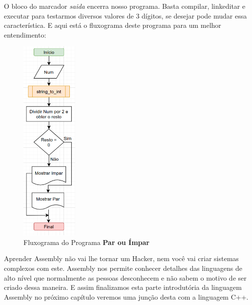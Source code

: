O bloco do marcador \textit{saida} encerra nosso programa. Basta compilar, linkeditar e executar para testarmos diversos valores de 3 dígitos, se desejar pode mudar essa característica. E aqui está o fluxograma deste programa para um melhor entendimento:
\begin{figure}[H]
	\centering
	\includegraphics[width=0.25\textwidth]{Pictures/cap01/programa17}
	\caption{Fluxograma do Programa \textbf{Par ou Ímpar}}
\end{figure}

Aprender Assembly não vai lhe tornar um Hacker, nem você vai criar sistemas complexos com este. Assembly nos permite conhecer detalhes das linguagens de alto nível que normalmente as pessoas desconhecem e não sabem o motivo de ser criado dessa maneira. E assim finalizamos esta parte introdutória da linguagem Assembly no próximo capítulo veremos uma junção desta com a linguagem C++.

\clearpage